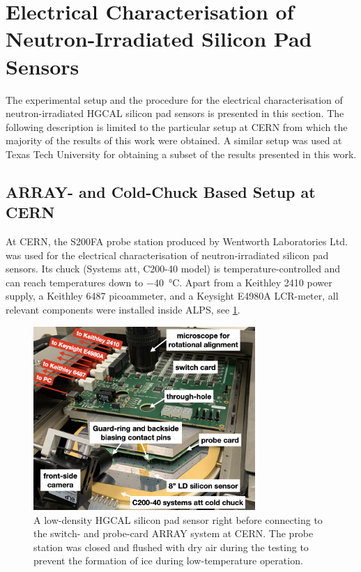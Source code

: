 \section{Electrical Characterisation of Neutron-Irradiated Silicon Pad Sensors}
\label{sec:setup}
The experimental setup and the procedure for the electrical characterisation of neutron-irradiated HGCAL silicon pad sensors is presented in this section.
The following description is limited to the particular setup at CERN from which the majority of the results of this work were obtained.
A similar setup was used at Texas Tech University for obtaining a subset of the results presented in this work.

\subsection{ARRAY- and Cold-Chuck Based Setup at CERN}
\label{subsec:setup_alps}
At CERN, the S200FA probe station produced by Wentworth Laboratories Ltd. was used for the electrical characterisation of neutron-irradiated silicon pad sensors. 
Its chuck (Systems att, C200-40 model) is temperature-controlled and can reach temperatures down to \SI{-40}{\celsius}.
Apart from a Keithley 2410 power supply, a Keithley 6487 picoammeter, and a Keysight E4980A LCR-meter, all relevant components were installed inside ALPS, see \ref{fig:ALPS_setup}.
\begin{figure}
	\centering
	\includegraphics[width=0.75\textwidth]{figures/ALPS_photo_edit.jpeg}
	\caption{
		A low-density HGCAL silicon pad sensor right before connecting to the switch- and probe-card ARRAY system at CERN.
		The probe station was closed and flushed with dry air during the testing to prevent the formation of ice during low-temperature operation.
		}
		\label{fig:ALPS_setup}
	\end{figure}
